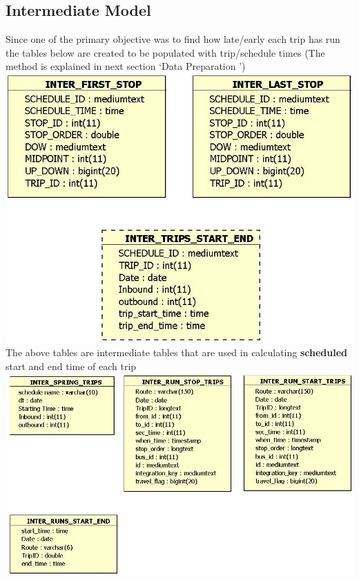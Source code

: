 \documentclass[12pt]{article}\usepackage[]{graphicx}\usepackage[]{color}
\begin{document}
\subsection{Intermediate Model}
Since one of the primary objective was to find how late/early each trip has run the tables below are created to be populated with trip/schedule times (The method is explained in next section \lq Data Preparation \rq)\\
\includegraphics[scale=0.5]{resources/Inter_schedule}\\[1cm] 
The above tables are intermediate tables that are used in calculating \textbf{scheduled} start and end time of each trip\\
\includegraphics[scale=0.5]{resources/Inter_runs}\\[1cm] 
\end{document}
